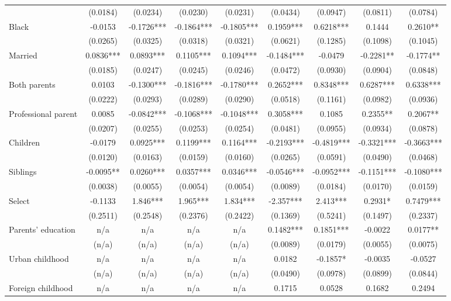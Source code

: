 \documentclass[12pt]{report}
\begin{document}
\begin{sidewaystable}
\begin{tabular}{lc|c|c|c|c|c|c|c}
& (0.0184) & (0.0234) & (0.0230) & (0.0231) & (0.0434) & (0.0947) & (0.0811) & (0.0784)\\
Black & -0.0153 & -0.1726*** & -0.1864*** & -0.1805*** & 0.1959*** & 0.6218*** & 0.1444 & 0.2610**\\
& (0.0265) & (0.0325) & (0.0318) & (0.0321) & (0.0621) & (0.1285) & (0.1098) & (0.1045)\\
Married & 0.0836*** & 0.0893*** & 0.1105*** & 0.1094*** & -0.1484*** & -0.0479 & -0.2281** & -0.1774**\\
& (0.0185) & (0.0247) & (0.0245) & (0.0246) & (0.0472) & (0.0930) & (0.0904) & (0.0848)\\
Both parents & 0.0103 & -0.1300*** & -0.1816*** & -0.1780*** & 0.2652*** & 0.8348*** & 0.6287*** & 0.6338***\\
& (0.0222) & (0.0293) & (0.0289) & (0.0290) & (0.0518) & (0.1161) & (0.0982) & (0.0936)\\
Professional parent & 0.0085 & -0.0842*** & -0.1068*** & -0.1048*** & 0.3058*** & 0.1085 & 0.2355** & 0.2067**\\
& (0.0207) & (0.0255) & (0.0253) & (0.0254) & (0.0481) & (0.0955) & (0.0934) & (0.0878)\\
Children & -0.0179 & 0.0925*** & 0.1199*** & 0.1164*** & -0.2193*** & -0.4819*** & -0.3321*** & -0.3663***\\
& (0.0120) & (0.0163) & (0.0159) & (0.0160) & (0.0265) & (0.0591) & (0.0490) & (0.0468)\\
Siblings & -0.0095** & 0.0260*** & 0.0357*** & 0.0346*** & -0.0546*** & -0.0952*** & -0.1151*** & -0.1080***\\
& (0.0038) & (0.0055) & (0.0054) & (0.0054) & (0.0089) & (0.0184) & (0.0170) & (0.0159)\\
Select & -0.1133 & 1.846*** & 1.965*** & 1.834*** & -2.357*** & 2.413*** & 0.2931* & 0.7479***\\
& (0.2511) & (0.2548) & (0.2376) & (0.2422) & (0.1369) & (0.5241) & (0.1497) & (0.2337)\\
Parents' education & n/a & n/a & n/a & n/a & 0.1482*** & 0.1851*** & -0.0022 & 0.0177**\\
& (n/a) & (n/a) & (n/a) & (n/a) & (0.0089) & (0.0179) & (0.0055) & (0.0075)\\
Urban childhood & n/a & n/a & n/a & n/a & 0.0182 & -0.1857* & -0.0035 & -0.0527\\
& (n/a) & (n/a) & (n/a) & (n/a) & (0.0490) & (0.0978) & (0.0899) & (0.0844)\\
Foreign childhood & n/a & n/a & n/a & n/a & 0.1715 & 0.0528 & 0.1682 & 0.2494\\

\end{tabular}
\end{sidewaystable}
\end{document}
